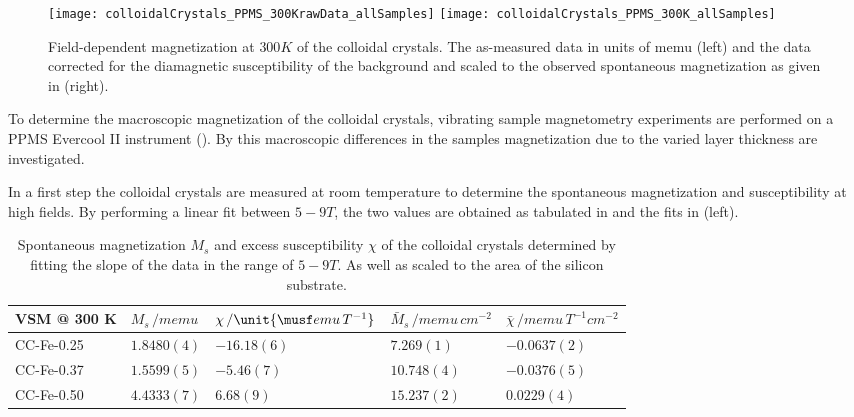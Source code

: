 \documentclass[\main/dresen_thesis.tex]{subfiles}
\begin{document}
  \label{sec:colloidalCrystals:vsm}

  \begin{figure}[tb]
    \centering
    \texttt{[image: colloidalCrystals\_PPMS\_300KrawData\_allSamples]}
    \texttt{[image: colloidalCrystals\_PPMS\_300K\_allSamples]}
    \caption{\label{fig:colloidalCrystals:RTVSM}Field-dependent magnetization at $300 \unit{K}$ of the colloidal crystals. The as-measured data in units of $\mathrm{memu}$ (left) and the data corrected for the diamagnetic susceptibility of the background and scaled to the observed spontaneous magnetization as given in  (right).}
  \end{figure}

  To determine the macroscopic magnetization of the colloidal crystals, vibrating sample magnetometry experiments are performed on a PPMS Evercool II instrument ().
  By this macroscopic differences in the samples magnetization due to the varied layer thickness are investigated.

    In a first step the colloidal crystals are measured at room temperature to determine the spontaneous magnetization and susceptibility at high fields.
    By performing a linear fit between $5 - 9 \unit{T}$, the two values are obtained as tabulated in  and the fits in  (left).
    \begin{table}[!htbp]
      \centering
      \caption{\label{tab:colloidalCrystals:RTVSM:parameters} Spontaneous magnetization $M_s$ and excess susceptibility $\chi$ of the colloidal crystals determined by fitting the slope of the data in the range of $5 - 9 \unit{T}$. As well as scaled to the area of the silicon substrate.}
      \begin{tabular}{ l | l | l || l | l}
        \rule{0pt}{2ex} \textbf{VSM @ 300 K}
        & $M_s \, / \unit{memu}$
        & $\chi \, / \unit{\musf emu \, T ^{-1}}$
        & $\bar{M}_s \, / \unit{memu \, cm^{-2}}$
        & $\bar{\chi} \, / \unit{memu \, T ^{-1} cm^{-2}}$ \\
        \hline
        \rule{0pt}{2ex} CC-Fe-0.25    & $1.8480(4)$   & $-16.18(6)$ & $7.269(1)$   & $-0.0637(2)$\\
        \rule{0pt}{2ex} CC-Fe-0.37    & $1.5599(5)$   & $-5.46(7)$  & $10.748(4)$  & $-0.0376(5)$\\
        \rule{0pt}{2ex} CC-Fe-0.50    & $4.4333(7)$   & $6.68(9)$   & $15.237(2)$  & $0.0229(4)$\\
        \hline
      \end{tabular}
    \end{table}
\end{document}
